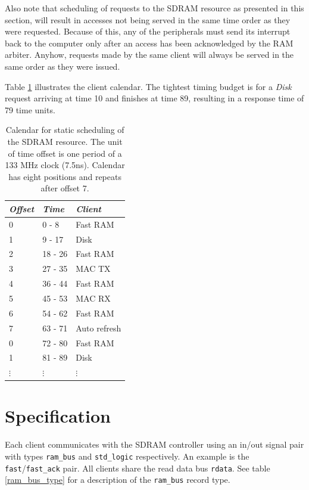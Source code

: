 \documentclass[a4paper]{report}
\begin{document}
Also note that scheduling of requests to the SDRAM
resource as presented in this section, will result in accesses
not being served in the same time order as they were requested.
Because of this, any of the peripherals must send its interrupt
back to the computer only after an access has been acknowledged
by the RAM arbiter.  Anyhow, requests made by the same client
will always be served in the same order as they were issued.

Table \ref{calendar} illustrates the client calendar. The
tightest timing budget is for a \emph{Disk} request
arriving at time 10 and finishes at time 89, resulting in a
response time of 79 time units.

\begin{table}
\begin{tabular}{*3l}    \toprule
\emph{Offset} & \emph{Time}   & \emph{Client} \\
\midrule
0         &  0 -  8     & Fast RAM      \\
1         &  9 - 17     & Disk          \\
2         & 18 - 26     & Fast RAM      \\
3         & 27 - 35     & MAC TX        \\
4         & 36 - 44     & Fast RAM      \\
5         & 45 - 53     & MAC RX        \\
6         & 54 - 62     & Fast RAM      \\
7         & 63 - 71     & Auto refresh  \\
\midrule            
0         & 72 - 80     & Fast RAM      \\
1         & 81 - 89     & Disk          \\
$\vdots$  & $\vdots$    & $\vdots$      \\
\bottomrule
 \hline
\end{tabular}
\caption{Calendar for static scheduling of the SDRAM resource.
The unit of time offset is one period of a 133 MHz clock (7.5ns).
Calendar has eight positions and repeats after offset 7.}
\label{calendar}
\end{table}

\section{Specification}
Each client communicates with the SDRAM controller
using an in/out signal pair with types \texttt{ram\_bus}
and \texttt{std\_logic} respectively. An example is the
\texttt{fast}/\texttt{fast\_ack} pair. All clients share the
read data bus \texttt{rdata}. See table \ref{ram_bus_type}
for a description of the \texttt{ram\_bus} record type.
\end{document}
